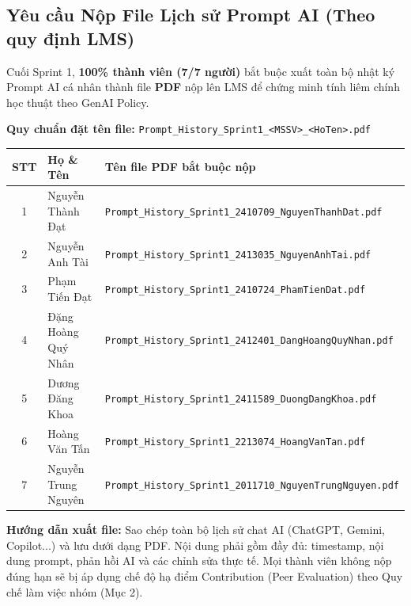 \documentclass[11pt,a4paper]{article}
\begin{document}
\subsection{Yêu cầu Nộp File Lịch sử Prompt AI (Theo quy định LMS)}

Cuối Sprint 1, \textbf{100\% thành viên (7/7 người)} bắt buộc xuất toàn bộ nhật ký Prompt AI cá nhân thành file \textbf{PDF} nộp lên LMS để chứng minh tính liêm chính học thuật theo GenAI Policy.

\textbf{Quy chuẩn đặt tên file:} \texttt{Prompt\_History\_Sprint1\_<MSSV>\_<HoTen>.pdf}

\vspace{3pt}
\begin{center}
\renewcommand{\arraystretch}{1.2}
{\small
\begin{tabularx}{0.96\linewidth}{|c|>{\raggedright\arraybackslash}p{4.2cm}|X|}
  \hline
  \rowcolor{lightgray} \textbf{STT} & \textbf{Họ \& Tên} & \textbf{Tên file PDF bắt buộc nộp} \\
  \hline
  1 & Nguyễn Thành Đạt & \texttt{Prompt\_History\_Sprint1\_2410709\_NguyenThanhDat.pdf} \\
  \hline
  2 & Nguyễn Anh Tài & \texttt{Prompt\_History\_Sprint1\_2413035\_NguyenAnhTai.pdf} \\
  \hline
  3 & Phạm Tiến Đạt & \texttt{Prompt\_History\_Sprint1\_2410724\_PhamTienDat.pdf} \\
  \hline
  4 & Đặng Hoàng Quý Nhân & \texttt{Prompt\_History\_Sprint1\_2412401\_DangHoangQuyNhan.pdf} \\
  \hline
  5 & Dương Đăng Khoa & \texttt{Prompt\_History\_Sprint1\_2411589\_DuongDangKhoa.pdf} \\
  \hline
  6 & Hoàng Văn Tấn & \texttt{Prompt\_History\_Sprint1\_2213074\_HoangVanTan.pdf} \\
  \hline
  7 & Nguyễn Trung Nguyên & \texttt{Prompt\_History\_Sprint1\_2011710\_NguyenTrungNguyen.pdf} \\
  \hline
\end{tabularx}}
\end{center}
\vspace{2pt}

\textbf{Hướng dẫn xuất file:} Sao chép toàn bộ lịch sử chat AI (ChatGPT, Gemini, Copilot...) và lưu dưới dạng PDF. Nội dung phải gồm đầy đủ: timestamp, nội dung prompt, phản hồi AI và các chỉnh sửa thực tế. Mọi thành viên không nộp đúng hạn sẽ bị áp dụng chế độ hạ điểm Contribution (Peer Evaluation) theo Quy chế làm việc nhóm (Mục 2).
\end{document}

